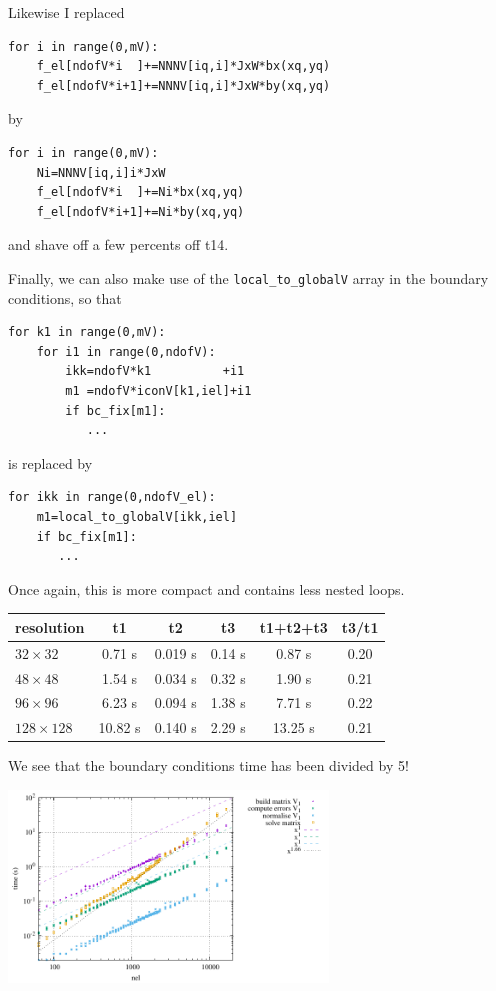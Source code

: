 Likewise I replaced
\begin{lstlisting}
for i in range(0,mV):
    f_el[ndofV*i  ]+=NNNV[iq,i]*JxW*bx(xq,yq)
    f_el[ndofV*i+1]+=NNNV[iq,i]*JxW*by(xq,yq)
\end{lstlisting}
by 
\begin{lstlisting}
for i in range(0,mV):
    Ni=NNNV[iq,i]i*JxW
    f_el[ndofV*i  ]+=Ni*bx(xq,yq)
    f_el[ndofV*i+1]+=Ni*by(xq,yq)
\end{lstlisting}
and shave off a few percents off t14.

Finally, we can also make use of the {\tt local\_to\_globalV}
array in the boundary conditions, so that 
\begin{lstlisting}
for k1 in range(0,mV):
    for i1 in range(0,ndofV):
        ikk=ndofV*k1          +i1
        m1 =ndofV*iconV[k1,iel]+i1
        if bc_fix[m1]:
           ...
\end{lstlisting}
is replaced by
\begin{lstlisting}
for ikk in range(0,ndofV_el):
    m1=local_to_globalV[ikk,iel]
    if bc_fix[m1]:
       ...
\end{lstlisting}
Once again, this is more compact and contains less nested loops.

\begin{center}
\begin{tabular}{lccccc}
\hline
resolution & t1 & t2 & t3 & t1+t2+t3 & t3/t1\\ 
\hline
\hline
$32\times 32$   &   0.71 s& 0.019 s& 0.14 s&  0.87 s& 0.20 \\  
$48\times 48$   &   1.54 s& 0.034 s& 0.32 s&  1.90 s& 0.21 \\
$96\times 96$   &   6.23 s& 0.094 s& 1.38 s&  7.71 s& 0.22 \\
$128\times 128$ &  10.82 s& 0.140 s& 2.29 s& 13.25 s& 0.21 \\
\hline
\end{tabular}
\end{center}
We see that the boundary conditions time has been divided by 5!


\begin{center}
\includegraphics[width=8.5cm]{python_codes/fieldstone_150/results/times_V7}
\end{center}

